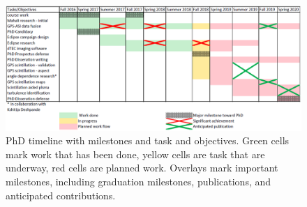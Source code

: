 \documentclass[letterpaper,12pt]{article}
\begin{document}
\begin{figure}[h]
\centering
\includegraphics[width=\textwidth]{fig/progress.png}
\caption{PhD timeline with milestones and task and objectives. Green cells mark work that has been done, yellow cells are task that are underway, red cells are planned work. Overlays mark important milestones, including graduation milestones, publications, and anticipated contributions.}
\label{fig:progress}
\end{figure}
%
\end{document}
